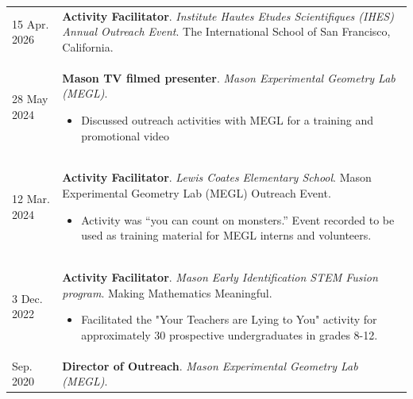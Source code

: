     \begin{center}
    {
    \renewcommand{\arraystretch}{1.2}
    \begin{longtable}{p{}  p{}}
    15 Apr.  2026 & \textbf{Activity Facilitator}. \textit{Institute Hautes Etudes Scientifiques (IHES) Annual Outreach Event}.  The International School of San Francisco, California.  \\ 
28 May  2024 & \textbf{Mason TV filmed presenter}. \textit{Mason Experimental Geometry Lab (MEGL)}. 
        \hspace{-1em}

        {\small
        \begin{itemize}
        \setlength{\parindent}{0em}
        \item[] Discussed outreach activities with MEGL for a training and promotional video
        \end{itemize}
        }
        \vspace{-1em}
         \\ 
12 Mar.  2024 & \textbf{Activity Facilitator}. \textit{Lewis Coates Elementary School}.  Mason Experimental Geometry Lab (MEGL) Outreach Event. 
        \hspace{-1em}

        {\small
        \begin{itemize}
        \setlength{\parindent}{0em}
        \item[] Activity was ``you can count on monsters.'' Event recorded to be used as training material for MEGL interns and volunteers.
        \end{itemize}
        }
        \vspace{-1em}
         \\ 
3 Dec.  2022 & \textbf{Activity Facilitator}. \textit{Mason Early Identification STEM Fusion program}.  Making Mathematics Meaningful. 
        \hspace{-1em}

        {\small
        \begin{itemize}
        \setlength{\parindent}{0em}
        \item[] Facilitated the "Your Teachers are Lying to You" activity for approximately 30 prospective undergraduates in grades 8-12.
        \end{itemize}
        }
        \vspace{-1em}
         \\ 
 Sep.  2020 & \textbf{Director of Outreach}. \textit{Mason Experimental Geometry Lab (MEGL)}. 
        \hspace{-1em}


\end{longtable}}
\end{center}

